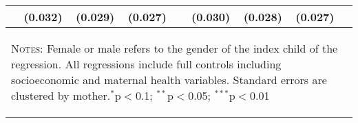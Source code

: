 \begin{table}[htpb!]
\begin{center}
{\begin{tabular}{lcccccccc}
&(0.032)&(0.029)&(0.027)&&(0.030)&(0.028)&(0.027)&\\
\midrule\multicolumn{9}{p{14.2cm}}{\begin{footnotesize}\textsc{Notes:} Female or male refers to the gender of the index child of the regression. 
All regressions include full controls including socioeconomic and maternal health variables. Standard errors are clustered 
 by mother.$^{*}$p$<$0.1; $^{**}$p$<$0.05; $^{***}$p$<$0.01
\end{footnotesize}} \\ \bottomrule 
\end{tabular}}\end{center}\end{table}
